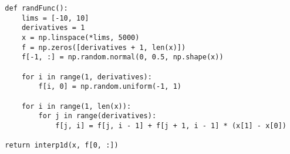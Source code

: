\lstset{language=Python}
\lstset{frame=lines}
\lstset{basicstyle=\footnotesize}
\begin{lstlisting}
  def randFunc():
      lims = [-10, 10]
      derivatives = 1
      x = np.linspace(*lims, 5000)
      f = np.zeros([derivatives + 1, len(x)])
      f[-1, :] = np.random.normal(0, 0.5, np.shape(x))

      for i in range(1, derivatives):
          f[i, 0] = np.random.uniform(-1, 1)

      for i in range(1, len(x)):
          for j in range(derivatives):
              f[j, i] = f[j, i - 1] + f[j + 1, i - 1] * (x[1] - x[0])

  return interp1d(x, f[0, :])

\end{lstlisting}




